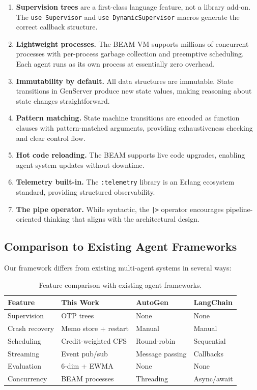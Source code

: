 \documentclass[12pt,a4paper]{article}
\theoremstyle{definition}
\theoremstyle{remark}
\begin{document}
\begin{enumerate}[leftmargin=2em]
  \item \textbf{Supervision trees} are a first-class language feature, not a library add-on. The \texttt{use Supervisor} and \texttt{use DynamicSupervisor} macros generate the correct callback structure.
  \item \textbf{Lightweight processes.} The BEAM VM supports millions of concurrent processes with per-process garbage collection and preemptive scheduling. Each agent runs as its own process at essentially zero overhead.
  \item \textbf{Immutability by default.} All data structures are immutable. State transitions in GenServer produce new state values, making reasoning about state changes straightforward.
  \item \textbf{Pattern matching.} State machine transitions are encoded as function clauses with pattern-matched arguments, providing exhaustiveness checking and clear control flow.
  \item \textbf{Hot code reloading.} The BEAM supports live code upgrades, enabling agent system updates without downtime.
  \item \textbf{Telemetry built-in.} The \texttt{:telemetry} library is an Erlang ecosystem standard, providing structured observability.
  \item \textbf{The pipe operator.} While syntactic, the \texttt{|>} operator encourages pipeline-oriented thinking that aligns with the architectural design.
\end{enumerate}

\subsection{Comparison to Existing Agent Frameworks}

Our framework differs from existing multi-agent systems in several ways:

\begin{table}[H]
\centering
\small
\begin{tabular}{@{}llll@{}}
\toprule
\textbf{Feature} & \textbf{This Work} & \textbf{AutoGen} & \textbf{LangChain} \\
\midrule
Supervision & OTP trees & None & None \\
Crash recovery & Memo store + restart & Manual & Manual \\
Scheduling & Credit-weighted CFS & Round-robin & Sequential \\
Streaming & Event pub/sub & Message passing & Callbacks \\
Evaluation & 6-dim + EWMA & None & None \\
Concurrency & BEAM processes & Threading & Async/await \\
\bottomrule
\end{tabular}
\caption{Feature comparison with existing agent frameworks.}\label{tab:framework-comparison}
\end{table}
\end{document}
